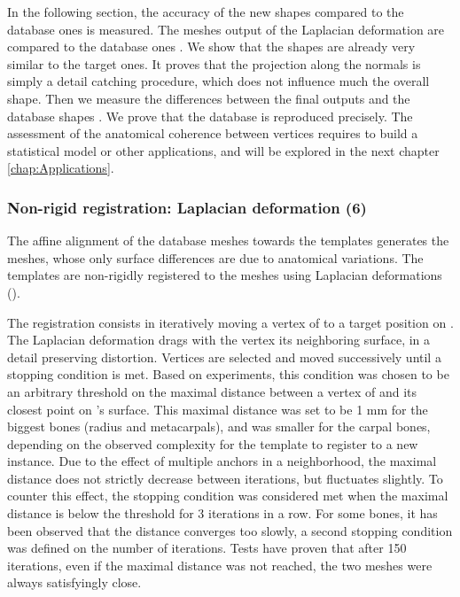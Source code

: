 In the following section, the accuracy of the new shapes compared to the database ones is measured. The meshes output of the Laplacian deformation \ml* are compared to the database ones \mr*. We show that the shapes are already very similar to the target ones. It proves that the projection along the normals is simply a detail catching procedure, which does not influence much the overall shape. Then we measure the differences between the final outputs \mw* and the database shapes \mr*. We prove that the database is reproduced precisely. The assessment of the anatomical coherence between vertices requires to build a statistical model or other applications, and will be explored in the next chapter \ref{chap:Applications}. 



\subsubsection{Non-rigid registration: Laplacian deformation (6)}
\label{ssubsec:laplacian_validation}


The affine alignment of the database meshes \md* towards the templates \mt* generates the \mr* meshes, whose only surface differences are due to anatomical variations. The templates are non-rigidly registered to the \mr* meshes using Laplacian deformations (). 

The registration consists in iteratively moving a vertex of \mt* to a target position on \mr*. The Laplacian deformation drags with the vertex its neighboring surface, in a detail preserving distortion. Vertices are selected and moved successively until a stopping condition is met. Based on experiments, this condition was chosen to be an arbitrary threshold on the maximal distance between a vertex of \mt* and its closest point on \mr*'s surface. This maximal distance was set to be 1 mm for the biggest bones (radius and metacarpals), and was smaller for the carpal bones, depending on the observed complexity for the template to register to a new instance. Due to the effect of multiple anchors in a neighborhood, the maximal distance does not strictly decrease between iterations, but fluctuates slightly. To counter this effect, the stopping condition was considered met when the maximal distance is below the threshold for 3 iterations in a row. For some bones, it has been observed that the distance converges too slowly, a second stopping condition was defined on the number of iterations. Tests have proven that after 150 iterations, even if the maximal distance was not reached, the two meshes were always satisfyingly close. 

